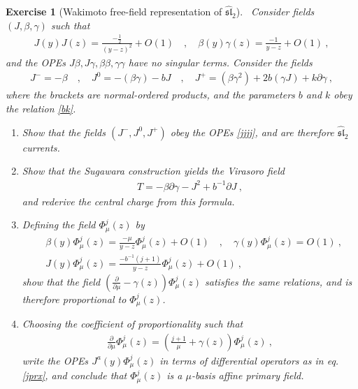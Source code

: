 \documentclass[12pt, a4paper, notitlepage, twoside]{report}
\numberwithin{equation}{section}
\theoremstyle{break}
\newtheorem{exo}{Exercise}[chapter]
\begin{document}
\begin{exo}[Wakimoto free-field representation of $\widehat{\mathfrak{sl}}_2$]
 ~\label{exowaki}
Consider fields $(J,\beta,\gamma)$ such that 
\begin{align}
 J(y)J(z) = \frac{-\frac12}{(y-z)^2} + O(1) \quad , \quad \beta(y)\gamma(z) = \frac{-1}{y-z} + O(1)\ ,
\end{align}
and the OPEs $J\beta,J\gamma,\beta\beta,\gamma\gamma$ have no singular terms.
Consider the fields 
\begin{align}
 J^- = -\beta \quad , \quad J^0 = -(\beta\gamma) - bJ \quad , \quad J^+ = (\beta\gamma^2)+2b(\gamma J)+k\partial\gamma\ ,
\end{align}
where the brackets are normal-ordered products, and the parameters $b$ and $k$ obey the relation \eqref{bk}.

\begin{enumerate}
 \item 
Show that the fields $(J^-,J^0,J^+)$ obey the OPEs \eqref{jjjj}, and are therefore $\widehat{\mathfrak{sl}}_2$ currents. 
\item
Show that the Sugawara construction yields the Virasoro field
\begin{align}
 T = -\beta \partial\gamma - J^2 +b^{-1}\partial J\ ,
\end{align}
and rederive the central charge from this formula.

\item
Defining the field $\Phi^j_\mu(z)$ by 
\begin{align}
 & \beta(y)\Phi^j_\mu(z) = \frac{-\mu}{y-z}\Phi^j_\mu(z)+ O(1) \quad , \quad \gamma(y)\Phi^j_\mu(z)=O(1)\ , 
\\
 & J(y)\Phi^j_\mu(z) = \frac{-b^{-1}(j+1)}{y-z}\Phi^j_\mu(z)+ O(1)\ ,
\end{align}
show that the field $\left({\frac{\partial}{\partial \mu}}-\gamma(z)\right)\Phi^j_\mu(z)$ satisfies the same relations, and is therefore proportional to $\Phi^j_\mu(z)$.

\item
Choosing the coefficient of proportionality such that
\begin{align}
 {\frac{\partial}{\partial \mu}}\Phi^j_\mu(z) =\left(\frac{j+1}{\mu}+\gamma(z)\right)\Phi^j_\mu(z)\ ,
\end{align}
write the OPEs $J^a(y)\Phi^j_\mu(z)$ in terms of differential operators as in eq. \eqref{jprx}, and conclude that $\Phi^j_\mu(z)$ is a $\mu$-basis affine primary field.
\end{enumerate}
\end{exo}
\end{document}
